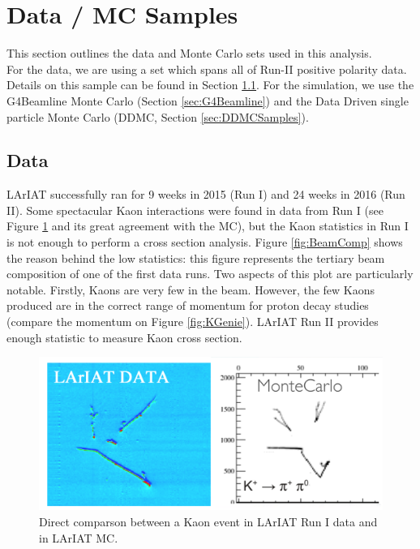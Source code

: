 \section{Data / MC Samples}\label{sec:DataSamples}

This section outlines the data and Monte Carlo sets used in this analysis. \\
For the data, we are using a set which spans all of Run-II positive polarity data. Details on this sample can be found in Section \ref{sec:data}. For the simulation, we use the G4Beamline Monte Carlo (Section \ref{sec:G4Beamline}) and the Data Driven single particle Monte Carlo (DDMC, Section \ref{sec:DDMCSamples}). 


\subsection{Data}\label{sec:data}



LArIAT successfully ran for 9 weeks in 2015 (Run I) and 24 weeks in 2016 (Run II). Some spectacular Kaon interactions were found in data from Run I (see Figure \ref{fig:MCdata} and its great agreement with the MC),
but the Kaon statistics in Run I is not enough to perform a cross section analysis. Figure \ref{fig:BeamComp} shows the reason behind the low statistics: this figure represents the tertiary beam composition of one of the first data runs. Two aspects of this plot are particularly notable. Firstly, Kaons are very few in the beam. However, the few Kaons produced are in the correct range of momentum for proton decay studies (compare the momentum on Figure \ref{fig:KGenie}).  LArIAT Run II provides enough statistic to measure Kaon cross section. 
\begin{figure}[hpbt]
\centering
\includegraphics[width=6in]{images/Lariat/KDataMC}
\caption{Direct comparson between a Kaon event in LArIAT Run I data and in LArIAT MC. }
\label{fig:MCdata}
\end{figure}


